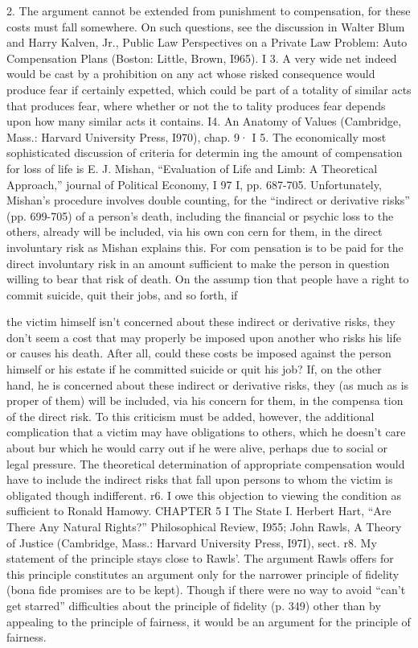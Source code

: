 \documentclass[11pt,openany]{book}
\begin{document}
{2. The argument cannot be extended from punishment to compensation, for these costs must fall somewhere. On such questions, see the discussion in Walter Blum and Harry Kalven, Jr., Public Law Perspectives on a Private Law Problem: Auto Compensation Plans (Boston: Little, Brown, I965). I 3. A very wide net indeed would be cast by a prohibition on any act whose risked consequence would produce fear if certainly expetted, which could be part of a totality of similar acts that produces fear, where whether or not the to tality produces fear depends upon how many similar acts it contains. I4. An Anatomy of Values (Cambridge, Mass.: Harvard University Press, I970), chap. 9· I 5. The economically most sophisticated discussion of criteria for determin ing the amount of compensation for loss of life is E. J. Mishan, ``Evaluation of Life and Limb: A Theoretical Approach,'' journal of Political Economy, I 97 I, pp. 687-705. Unfortunately, Mishan's procedure involves double counting, for the ``indirect or derivative risks'' (pp. 699-705) of a person's death, including the financial or psychic loss to the others, already will be included, via his own con cern for them, in the direct involuntary risk as Mishan explains this. For com pensation is to be paid for the direct involuntary risk in an amount sufficient to make the person in question willing to bear that risk of death. On the assump tion that people have a right to commit suicide, quit their jobs, and so forth, if\par

the victim himself isn't concerned about these indirect or derivative risks, they don't seem a cost that may properly be imposed upon another who risks his life or causes his death. After all, could these costs be imposed against the person himself or his estate if he committed suicide or quit his job? If, on the other hand, he is concerned about these indirect or derivative risks, they (as much as is proper of them) will be included, via his concern for them, in the compensa tion of the direct risk. To this criticism must be added, however, the additional complication that a victim may have obligations to others, which he doesn't care about bur which he would carry out if he were alive, perhaps due to social or legal pressure. The theoretical determination of appropriate compensation would have to include the indirect risks that fall upon persons to whom the victim is obligated though indifferent. r6. I owe this objection to viewing the condition as sufficient to Ronald Hamowy. CHAPTER 5 I The State I. Herbert Hart, ``Are There Any Natural Rights?'' Philosophical Review, I955; John Rawls, A Theory of Justice (Cambridge, Mass.: Harvard University Press, I97I), sect. r8. My statement of the principle stays close to Rawls'. The argument Rawls offers for this principle constitutes an argument only for the narrower principle of fidelity (bona fide promises are to be kept). Though if there were no way to avoid ``can't get starred'' difficulties about the principle of fidelity (p. 349) other than by appealing to the principle of fairness, it would be an argument for the principle of fairness.\par

}
\end{document}
